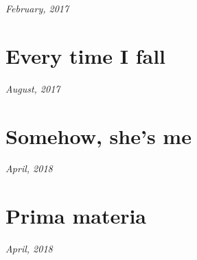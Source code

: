 \documentclass[10pt]{memoir}
\begin{document}
  \hfill\textit{February, 2017}

  
  \newpage

  \section{Every time I fall}

  \hfill\textit{August, 2017}

  
  \newpage


  \section{Somehow, she's me}

  \hfill\textit{April, 2018}

  
  \newpage


  \section{Prima materia}

  \hfill\textit{April, 2018}

  
\end{document}
